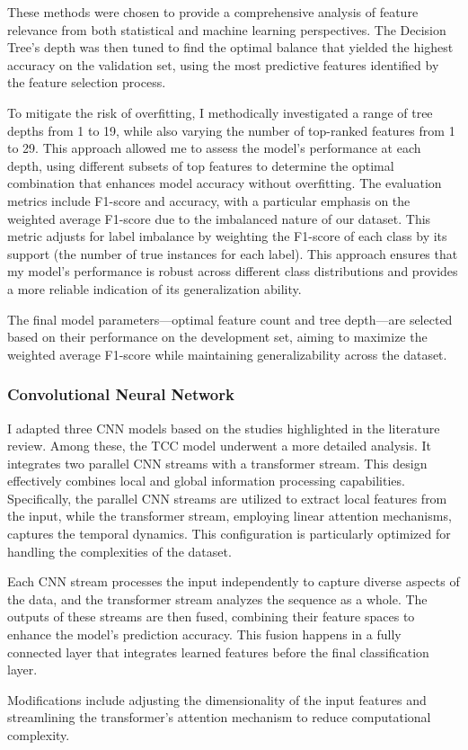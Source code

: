 These methods were chosen to provide a comprehensive analysis of feature relevance from both statistical and machine learning perspectives. The Decision Tree's depth was then tuned to find the optimal balance that yielded the highest accuracy on the validation set, using the most predictive features identified by the feature selection process.

To mitigate the risk of overfitting, I methodically investigated a range of tree depths from 1 to 19, while also varying the number of top-ranked features from 1 to 29. This approach allowed me to assess the model’s performance at each depth, using different subsets of top features to determine the optimal combination that enhances model accuracy without overfitting. The evaluation metrics include F1-score \cite{gfg_f1score} and accuracy, with a particular emphasis on the weighted average F1-score due to the imbalanced nature of our dataset. This metric adjusts for label imbalance by weighting the F1-score of each class by its support (the number of true instances for each label). This approach ensures that my model's performance is robust across different class distributions and provides a more reliable indication of its generalization ability.

The final model parameters—optimal feature count and tree depth—are selected based on their performance on the development set, aiming to maximize the weighted average F1-score while maintaining generalizability across the dataset.

\subsubsection{Convolutional Neural Network}

I adapted three CNN models based on the studies highlighted in the literature review. Among these, the TCC model underwent a more detailed analysis. It integrates two parallel CNN streams with a transformer stream. This design effectively combines local and global information processing capabilities. Specifically, the parallel CNN streams are utilized to extract local features from the input, while the transformer stream, employing linear attention mechanisms, captures the temporal dynamics. This configuration is particularly optimized for handling the complexities of the dataset.

Each CNN stream processes the input independently to capture diverse aspects of the data, and the transformer stream analyzes the sequence as a whole. The outputs of these streams are then fused, combining their feature spaces to enhance the model's prediction accuracy. This fusion happens in a fully connected layer that integrates learned features before the final classification layer.

Modifications include adjusting the dimensionality of the input features and streamlining the transformer's attention mechanism to reduce computational complexity.

